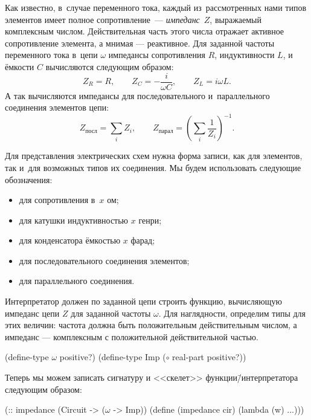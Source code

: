 Как известно, в~случае переменного тока, каждый из~рассмотренных нами типов элементов имеет полное сопротивление~--- \emph{импеданс}~$Z$, выражаемый комплексным числом. Действительная часть этого числа отражает активное сопротивление элемента, а мнимая --- реактивное. Для заданной частоты переменного тока в~цепи $\omega$ импедансы сопротивления $R$, индуктивности $L$, и ёмкости $C$ вычисляются следующим образом:
$$Z_R = R,\qquad Z_C = -\frac{i}{\omega C},\qquad Z_L = i\omega L.$$
А так вычисляются импедансы для последовательного и~параллельного соединения элементов цепи:
$$Z_\text{посл} = \sum\limits_i Z_i,\qquad  Z_\text{парал}= \left(\sum\limits_i\frac1{Z_i}\right)^{-1}.$$

Для представления электрических схем нужна форма записи, как для элементов, так и~для возможных типов их соединения. Мы будем использовать следующие обозначения:

\begin{itemize}
 \item[]  для сопротивления в~$x$ ом;

 \item[]  для катушки индуктивностью $x$ генри;

 \item[]  для конденсатора ёмкостью $x$ фарад;

 \item[]  для последовательного соединения элементов;

 \item[]  для параллельного соединения.
\end{itemize}

 Интерпретатор должен по заданной цепи строить функцию, вычисляющую импеданс цепи $Z$ для заданной частоты $\omega$. 
Для наглядности, определим типы для этих величин: частота должна быть положительным действительным числом, а импеданс --- комплексным с положительной действительной частью.
\begin{Definition}
 (define-type $\omega$ positive?)
 (define-type Imp ($\circ$ real-part positive?))
\end{Definition}
Теперь мы можем записать сигнатуру и <<скелет>> функции\=/интерпретатора  следующим образом:
\label{example:impedance}%
\begin{SchemeCode}[emph={cir,w}]
(:: impedance (Circuit -> ($\omega$ -> Imp))
 (define (impedance cir)
   (lambda (w) ...)))
\end{SchemeCode}

